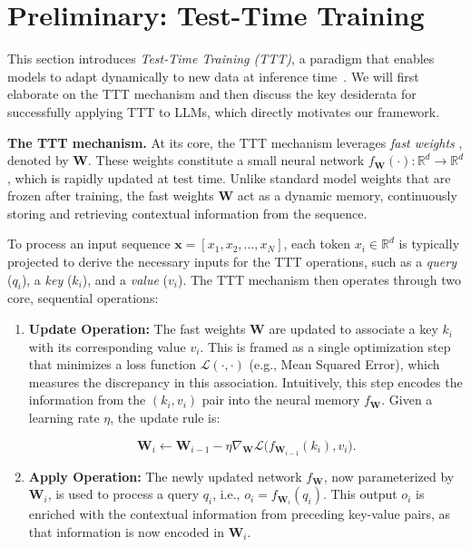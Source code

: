 
\section{Preliminary: Test-Time Training}
\label{sec:preliminary}

This section introduces \emph{Test-Time Training (TTT)}, a paradigm that enables models to adapt dynamically to new data at inference time~\citep{sun2020ttt, sun2024tttLayers, zhang2025tttdr}. We will first elaborate on the TTT mechanism and then discuss the key desiderata for successfully applying TTT to LLMs, which directly motivates our framework.

\textbf{The TTT mechanism.} At its core, the TTT mechanism leverages \emph{fast weights} \citep{ba2016fastweights,schlag2021linear}, denoted by $\mathbf{W}$. These weights constitute a small neural network $f_\mathbf{W}(\cdot):\mathbb{R}^d\to\mathbb{R}^d$, which is rapidly updated at test time. Unlike standard model weights that are frozen after training, the fast weights $\mathbf{W}$ act as a dynamic memory, continuously storing and retrieving contextual information from the sequence. 

To process an input sequence $\mathbf{x} = [x_1, x_2, \dots, x_N]$, each token $x_i\in\mathbb{R}^d$ is typically projected to derive the necessary inputs for the TTT operations, such as a \emph{query} ($q_i$), a \emph{key} ($k_i$), and a \emph{value} ($v_i$). The TTT mechanism then operates through two core, sequential operations:

\begin{enumerate}
    \item \textbf{Update Operation:} The fast weights $\mathbf{W}$ are updated to associate a key $k_i$ with its corresponding value $v_i$. This is framed as a single optimization step that minimizes a loss function $\mathcal{L}(\cdot, \cdot)$ (e.g., Mean Squared Error), which measures the discrepancy in this association. Intuitively, this step encodes the information from the $(k_i,v_i)$ pair into the neural memory $f_\mathbf{W}$. Given a learning rate $\eta$, the update rule is:

    \begin{equation*}
        \mathbf{W}_i \leftarrow \mathbf{W}_{i-1} - \eta \nabla_{\mathbf{W}} \mathcal{L}\big(f_{\mathbf{W}_{i-1}}(k_i), v_i\big).
    \end{equation*}
    \item \textbf{Apply Operation:} The newly updated network $f_\mathbf{W}$, now parameterized by $\mathbf{W}_i$, is used to process a query $q_i$, i.e., $o_i = f_{\mathbf{W}_i}(q_i)$. This output $o_i$ is enriched with the contextual information from preceding key-value pairs, as that information is now encoded in $\mathbf{W}_i$.
\end{enumerate}

